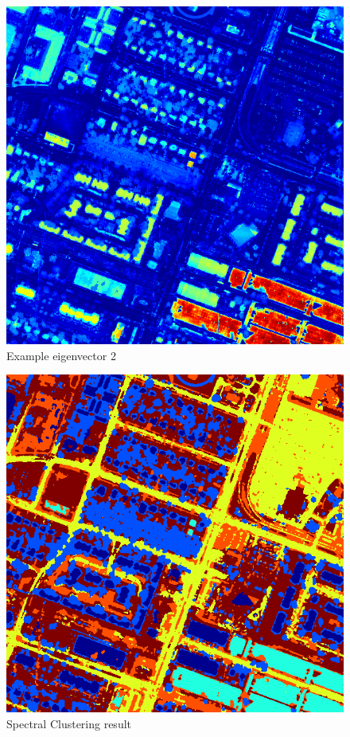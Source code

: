 \documentclass{article}[11pt]
\begin{document}
\begin{figure}
  \includegraphics[width=\linewidth]{evec2.png}
  \caption{Example eigenvector 2}
\end{figure}

\begin{figure}
  \includegraphics[width=\linewidth]{specClust4Norm.png}
  \caption{Spectral Clustering result}
\end{figure}
\end{document}
